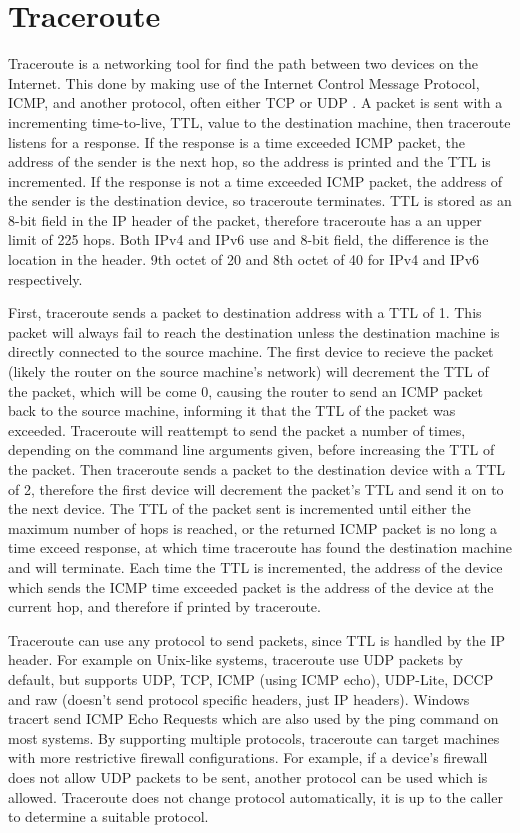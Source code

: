 \documentclass[10pt,a4paper]{article}
\begin{document}
    \section{Traceroute}\label{sec:traceroute}
    Traceroute is a networking tool for find the path between two devices on the Internet.
    This done by making use of the Internet Control Message Protocol, ICMP, and another protocol, often either TCP or UDP .
    A packet is sent with a incrementing time-to-live, TTL, value to the destination machine, then traceroute listens
    for a response.
    If the response is a time exceeded ICMP packet, the address of the sender is the next hop, so the address is printed
    and the TTL is incremented.
    If the response is not a time exceeded ICMP packet, the address of the sender is the destination device, so
    traceroute terminates.
    TTL is stored as an 8-bit field in the IP header of the packet, therefore traceroute has a an upper limit of 225
    hops.
    Both IPv4 and IPv6 use and 8-bit field, the difference is the location in the header.
    9th octet of 20 and 8th octet of 40 for IPv4 and IPv6 respectively.

    First, traceroute sends a packet to destination address with a TTL of 1.
    This packet will always fail to reach the destination unless the destination machine is directly connected to the
    source machine.
    The first device to recieve the packet (likely the router on the source machine's network) will decrement the TTL of
    the packet, which will be come 0, causing the router to send an ICMP packet back to the source machine, informing it
    that the TTL of the packet was exceeded.
    Traceroute will reattempt to send the packet a number of times, depending on the command line arguments given, before
    increasing the TTL of the packet.
    Then traceroute sends a packet to the destination device with a TTL of 2, therefore the first device will decrement
    the packet's TTL and send it on to the next device.
    The TTL of the packet sent is incremented until either the maximum number of hops is reached, or the returned ICMP
    packet is no long a time exceed response, at which time traceroute has found the destination machine and
    will terminate.
    Each time the TTL is incremented, the address of the device which sends the ICMP time exceeded packet is the address
    of the device at the current hop, and therefore if printed by traceroute.

    Traceroute can use any protocol to send packets, since TTL is handled by the IP header.
    For example on Unix-like systems, traceroute use UDP packets by default, but supports UDP, TCP, ICMP (using ICMP
    echo), UDP-Lite, DCCP and raw (doesn't send protocol specific headers, just IP headers).
    Windows tracert send ICMP Echo Requests which are also used by the ping command on most systems.
    By supporting multiple protocols, traceroute can target machines with more restrictive firewall configurations.
    For example, if a device's firewall does not allow UDP packets to be sent, another protocol can be used which is
    allowed.
    Traceroute does not change protocol automatically, it is up to the caller to determine a suitable protocol.
\end{document}
